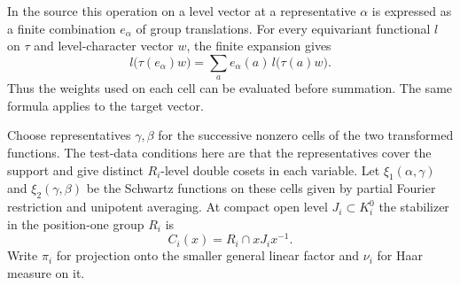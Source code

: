 In the source this operation on a level vector
at a representative \(\alpha\) is expressed as a finite
combination \(e_\alpha\) of group translations. For every equivariant functional \(l\) on \(\tau\) and
level-character vector \(w\), the finite expansion gives
\[
 l\big(\tau(e_\alpha)w\big)=\sum_a e_\alpha(a)\,l\big(\tau(a)w\big).
\]
Thus the weights used on each cell can be evaluated before summation. The same formula applies
to the target vector.

Choose representatives \(\gamma,\beta\) for the successive
nonzero cells of the two transformed functions. The test-data
conditions here are that the representatives cover the support
and give distinct \(R_i\)-level double cosets in each variable.
Let \(\xi_1(\alpha,\gamma)\) and \(\xi_2(\gamma,\beta)\) be the Schwartz
functions on these cells given by partial Fourier restriction and
unipotent averaging. At compact open level \(J_i\subset K_i^0\) the
stabilizer in the position-one group \(R_i\) is
\[
                      C_i(x)=R_i\cap xJ_ix^{-1}.
\] Write
\(\pi_i\) for projection onto the smaller general linear factor
and \(\nu_i\) for Haar measure on it.

